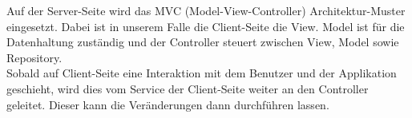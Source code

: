 Auf der Server-Seite wird das MVC (Model-View-Controller) Architektur-Muster eingesetzt. Dabei ist in unserem Falle die Client-Seite die View. Model ist für die Datenhaltung zuständig und der Controller steuert zwischen View, Model sowie Repository.  \\
Sobald auf Client-Seite eine Interaktion mit dem Benutzer und der Applikation geschieht, wird dies vom Service der Client-Seite weiter an den Controller geleitet. Dieser kann die Veränderungen dann durchführen lassen.

